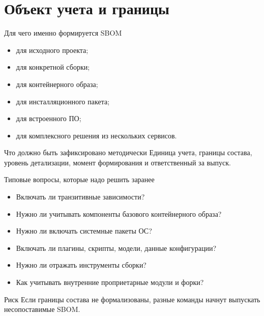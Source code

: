 \documentclass[aspectratio=169,10pt]{beamer}
\begin{document}
\section{Объект учета и границы}

\begin{frame}{Для чего именно формируется SBOM}
\begin{itemize}
  \item для исходного проекта;
  \item для конкретной сборки;
  \item для контейнерного образа;
  \item для инсталляционного пакета;
  \item для встроенного ПО;
  \item для комплексного решения из нескольких сервисов.
\end{itemize}

\begin{block}{Что должно быть зафиксировано методически}
Единица учета, границы состава, уровень детализации, момент формирования и ответственный за выпуск.
\end{block}
\end{frame}

\begin{frame}{Типовые вопросы, которые надо решить заранее}
\begin{itemize}
  \item Включать ли транзитивные зависимости?
  \item Нужно ли учитывать компоненты базового контейнерного образа?
  \item Нужно ли включать системные пакеты ОС?
  \item Включать ли плагины, скрипты, модели, данные конфигурации?
  \item Нужно ли отражать инструменты сборки?
  \item Как учитывать внутренние проприетарные модули и форки?
\end{itemize}

\begin{alertblock}{Риск}
Если границы состава не формализованы, разные команды начнут выпускать несопоставимые SBOM.
\end{alertblock}
\end{frame}
\end{document}
